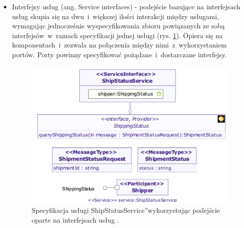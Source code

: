 \begin{itemize}
\item{Interfejsy usług (ang. Service interfaces) - podejście bazujące na interfejsach usług skupia się na dwu~i~większej ilości interakcji między usługami, wymagając jednocześnie wyspecyfikowania zbioru powiązanych ze sobą interfejsów~w~ramach specyfikacji jednej usługi (rys. \ref{service_interface_based_approach}). Opiera się na komponentach~i~zezwala na połączenia między nimi~z~wykorzystaniem portów. Porty powinny specyfikować pożądane~i~dostarczane interfejsy. 
\begin{figure}[h!tbp]
\begin{centering}
\includegraphics[width=11cm]{img/service_interface_based_approach.png}
\caption[Specyfikacja usługi \quotedblbase ShipStatusService\textquotedblright wykorzystując podejście oparte na interfejsach usług.]{Specyfikacja usługi \quotedblbase ShipStatusService\textquotedblright wykorzystując podejście oparte na interfejsach usług \cite{SoaMLErvBase}.}\label{service_interface_based_approach}
\end{centering}
\end{figure}} 


\end{itemize}
